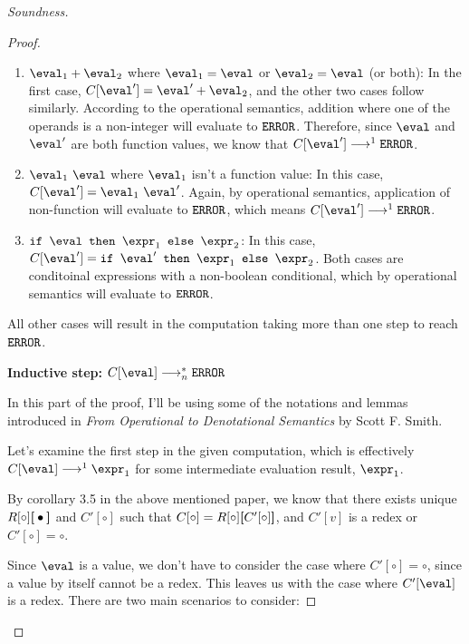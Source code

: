 \begin{proof}[Soundness]
\begin{proof}
    \begin{enumerate}
      \item $\eval_1 + \eval_2$ where $\eval_1 = \eval$ or $\eval_2 = \eval$ (or both): In the first case, $C[\eval'] = \eval' + \eval_2$, and the other two cases follow similarly. According to the operational semantics, addition where one of the operands is a non-integer will evaluate to $\texttt{ERROR}$. Therefore, since $\eval$ and $\eval'$ are both function values, we know that $C[\eval'] \smallstep[] \eerror$.
      \item $\eval_1 \ \eval$ where $\eval_1$ isn't a function value: In this case, $C[\eval'] = \eval_1 \ \eval'$. Again, by operational semantics, application of non-function will evaluate to $\texttt{ERROR}$, which means $C[\eval'] \smallstep[] \eerror$.
      \item $\ife{\eval}{\expr_1}{\expr_2}$: In this case, $C[\eval'] = \ife{\eval'}{\expr_1}{\expr_2}$. Both cases are conditoinal expressions with a non-boolean conditional, which by operational semantics will evaluate to $\texttt{ERROR}$.
    \end{enumerate}

    All other cases will result in the computation taking more than one step to reach $\texttt{ERROR}$.

    \textbf{Inductive step: }$C[\eval] \smallsteps[n] \eerror$

    In this part of the proof, I'll be using some of the notations and lemmas introduced in \textit{From Operational to Denotational Semantics} by Scott F. Smith.

    Let's examine the first step in the given computation, which is effectively $C[\eval] \smallstep[] \expr_1$ for some intermediate evaluation result, $\expr_1$.
    
    By corollary 3.5 in the above mentioned paper, we know that there exists unique $R[\circ]\textbf{[}\bullet\textbf{]}$ and $C'[\circ]$ such that $C[\circ] = R[\circ]\textbf{[}C'[\circ]\textbf{]}$, and $C'[v]$ is a redex or $C'[\circ] = \circ$.

    Since $\eval$ is a value, we don't have to consider the case where $C'[\circ] = \circ$, since a value by itself cannot be a redex. This leaves us with the case where $C'[\eval]$ is a redex. There are two main scenarios to consider:


\end{proof}
\end{proof}
